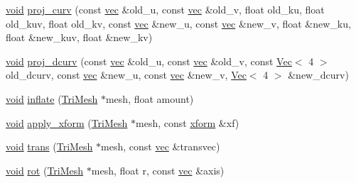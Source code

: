 \begin{DoxyCompactItemize}
\item 
\hyperlink{namespacetrimesh_a784ddfd979e1c579bda795a8edfc3f43}{void} \hyperlink{namespacetrimesh_afa7eab0c3bb13bd1c31da85e46984a6a}{proj\+\_\+curv} (const \hyperlink{namespacetrimesh_a4fc2b83feba99c931f837a0c7d4b4df1}{vec} \&old\+\_\+u, const \hyperlink{namespacetrimesh_a4fc2b83feba99c931f837a0c7d4b4df1}{vec} \&old\+\_\+v, float old\+\_\+ku, float old\+\_\+kuv, float old\+\_\+kv, const \hyperlink{namespacetrimesh_a4fc2b83feba99c931f837a0c7d4b4df1}{vec} \&new\+\_\+u, const \hyperlink{namespacetrimesh_a4fc2b83feba99c931f837a0c7d4b4df1}{vec} \&new\+\_\+v, float \&new\+\_\+ku, float \&new\+\_\+kuv, float \&new\+\_\+kv)
\item 
\hyperlink{namespacetrimesh_a784ddfd979e1c579bda795a8edfc3f43}{void} \hyperlink{namespacetrimesh_a0869493c6351b5ff95889cd7c3a0eb24}{proj\+\_\+dcurv} (const \hyperlink{namespacetrimesh_a4fc2b83feba99c931f837a0c7d4b4df1}{vec} \&old\+\_\+u, const \hyperlink{namespacetrimesh_a4fc2b83feba99c931f837a0c7d4b4df1}{vec} \&old\+\_\+v, const \hyperlink{classtrimesh_1_1Vec}{Vec}$<$ 4 $>$ old\+\_\+dcurv, const \hyperlink{namespacetrimesh_a4fc2b83feba99c931f837a0c7d4b4df1}{vec} \&new\+\_\+u, const \hyperlink{namespacetrimesh_a4fc2b83feba99c931f837a0c7d4b4df1}{vec} \&new\+\_\+v, \hyperlink{classtrimesh_1_1Vec}{Vec}$<$ 4 $>$ \&new\+\_\+dcurv)
\item 
\hyperlink{namespacetrimesh_a784ddfd979e1c579bda795a8edfc3f43}{void} \hyperlink{namespacetrimesh_aa066982422b3d01638abe8e043d85839}{inflate} (\hyperlink{classtrimesh_1_1TriMesh}{Tri\+Mesh} $\ast$mesh, float amount)
\item 
\hyperlink{namespacetrimesh_a784ddfd979e1c579bda795a8edfc3f43}{void} \hyperlink{namespacetrimesh_a64437f39a2aa06bf645b8433091a65f2}{apply\+\_\+xform} (\hyperlink{classtrimesh_1_1TriMesh}{Tri\+Mesh} $\ast$mesh, const \hyperlink{namespacetrimesh_ad504958f2f56e393991b848986a8459f}{xform} \&xf)
\item 
\hyperlink{namespacetrimesh_a784ddfd979e1c579bda795a8edfc3f43}{void} \hyperlink{namespacetrimesh_ab21687effea4389b4cb46ae1bce1576b}{trans} (\hyperlink{classtrimesh_1_1TriMesh}{Tri\+Mesh} $\ast$mesh, const \hyperlink{namespacetrimesh_a4fc2b83feba99c931f837a0c7d4b4df1}{vec} \&transvec)
\item 
\hyperlink{namespacetrimesh_a784ddfd979e1c579bda795a8edfc3f43}{void} \hyperlink{namespacetrimesh_a56d92b6392bcb92a44c3fff9d26b7711}{rot} (\hyperlink{classtrimesh_1_1TriMesh}{Tri\+Mesh} $\ast$mesh, float r, const \hyperlink{namespacetrimesh_a4fc2b83feba99c931f837a0c7d4b4df1}{vec} \&axis)

\end{DoxyCompactItemize}
